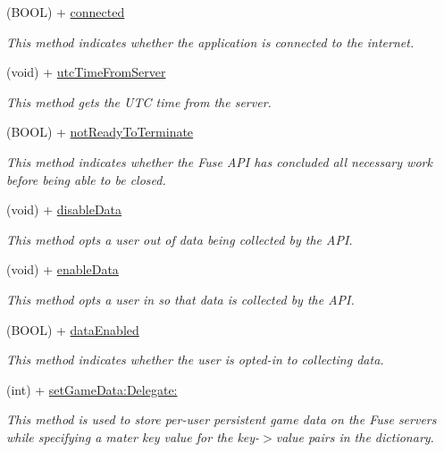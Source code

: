 \begin{DoxyCompactItemize}
(B\+O\+O\+L) + \hyperlink{interface_fuse_a_p_i_a6db77bb2cb4ba38f58666edfa470f7bd}{connected}
\begin{DoxyCompactList}\small\item\em This method indicates whether the application is connected to the internet. \end{DoxyCompactList}\item 
(void) + \hyperlink{interface_fuse_a_p_i_a60de732b9ecb7bce2439517cc2ca1f71}{utc\+Time\+From\+Server}
\begin{DoxyCompactList}\small\item\em This method gets the U\+T\+C time from the server. \end{DoxyCompactList}\item 
(B\+O\+O\+L) + \hyperlink{interface_fuse_a_p_i_adb24897bb2dd5a7521d1f7c3cb6e0d4d}{not\+Ready\+To\+Terminate}
\begin{DoxyCompactList}\small\item\em This method indicates whether the Fuse A\+P\+I has concluded all necessary work before being able to be closed. \end{DoxyCompactList}\item 
(void) + \hyperlink{interface_fuse_a_p_i_a70b5812f76a70821e3d6de1ac9e44c04}{disable\+Data}
\begin{DoxyCompactList}\small\item\em This method opts a user out of data being collected by the A\+P\+I. \end{DoxyCompactList}\item 
(void) + \hyperlink{interface_fuse_a_p_i_a8c0d55b6f8fad28e9cb150271a82df2f}{enable\+Data}
\begin{DoxyCompactList}\small\item\em This method opts a user in so that data is collected by the A\+P\+I. \end{DoxyCompactList}\item 
(B\+O\+O\+L) + \hyperlink{interface_fuse_a_p_i_a0462d911d4b1aec0c9e4ff77f3acd6fa}{data\+Enabled}
\begin{DoxyCompactList}\small\item\em This method indicates whether the user is opted-\/in to collecting data. \end{DoxyCompactList}\item 
(int) + \hyperlink{interface_fuse_a_p_i_a3da637831ec4d7dcd4d45cd7c547cd6a}{set\+Game\+Data\+:\+Delegate\+:}
\begin{DoxyCompactList}\small\item\em This method is used to store per-\/user persistent game data on the Fuse servers while specifying a mater key value for the key-\/$>$value pairs in the dictionary. \end{DoxyCompactList}\item 

\end{DoxyCompactItemize}
